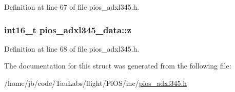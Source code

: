 \-Definition at line 67 of file pios\-\_\-adxl345.\-h.

\hypertarget{structpios__adxl345__data_a5d428741b731802a2974ef2598fe1a4c}{
\subsubsection[{z}]{\setlength{\rightskip}{0pt plus 5cm}int16\-\_\-t {\bf pios\-\_\-adxl345\-\_\-data\-::z}}}\label{structpios__adxl345__data_a5d428741b731802a2974ef2598fe1a4c}


\-Definition at line 68 of file pios\-\_\-adxl345.\-h.



\-The documentation for this struct was generated from the following file\-:\begin{DoxyCompactItemize}
\item 
/home/jb/code/\-Tau\-Labs/flight/\-Pi\-O\-S/inc/\hyperlink{pios__adxl345_8h}{pios\-\_\-adxl345.\-h}\end{DoxyCompactItemize}
